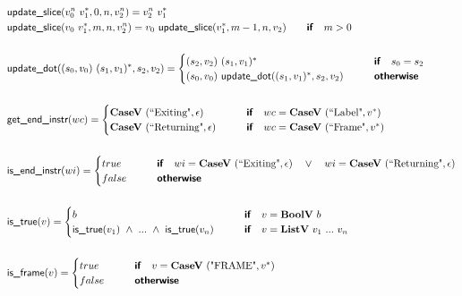 \begin{align*}
  &\updateslice(v_0^n ~ \seq{v_1}, 0, n, v_2^n) = v_2^n ~ \seq{v_1} \\
  &\updateslice(v_0 ~ \seq{v_1}, m, n, v_2^n) =  v_0 ~ \updateslice(\seq{v_1}, m-1, n, v_2)
  \quad\quad\premise{if}\quad m > 0 \\
%
\newline \\
  &\updatedot((s_0, v_0) ~ \seq{(s_1, v_1)}, s_2, v_2) =
  \begin{cases}
    (s_2, v_2) ~ \seq{(s_1, v_1)}
    &\quad\quad\premise{if}\quad s_0 = s_2 \\
    (s_0, v_0) ~ \updatedot(\seq{(s_1, v_1)}, s_2, v_2)
    &\quad\quad\premise{otherwise}
  \end{cases}
  \\
%
\newline \\
  &\getendinstr(wc) =
  \begin{cases}
    \casev ~ (\text{``Exiting"}, \epsilon) &\quad\quad\premise{if}\quad wc = \casev ~ (\text{``Label"}, \seq v)\\
    \casev ~ (\text{``Returning"}, \epsilon) &\quad\quad\premise{if}\quad wc = \casev ~ (\text{``Frame"}, \seq v)
  \end{cases} \\
%
\newline \\
  &\isendinstr(wi) =
  \begin{cases}
    true &\quad\quad\premise{if}\quad wi = \casev ~ (\text{``Exiting"}, \epsilon) \quad\lor\quad wi = \casev ~ (\text{``Returning"}, \epsilon)\\
    false &\quad\quad\premise{otherwise}
  \end{cases} \\
%
\newline \\
  &\istrue(v) =
  \begin{cases}
  b &\quad\quad\premise{if}\quad v = \boolv ~ b \\
    \istrue(v_1) ~ \land ~ ... ~ \land ~ \istrue(v_n) &\quad\quad\premise{if}\quad
    v = \listv ~ v_1 ~ ... ~ v_n \\
  \end{cases} \\
%
\newline \\
  &\isframe(v) =
  \begin{cases}
    true
    &\quad\quad\premise{if}\quad v = \casev ~ (\text{"FRAME"}, \seq v) \\
    false &\quad\quad\premise{otherwise}\\
  \end{cases}
  \\
\end{align*}




